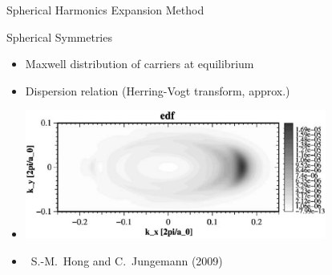 \documentclass[usepdftitle=false,handout,10pt]{beamer}
\begin{document}
\begin{frame}{Spherical Harmonics Expansion Method}

 \vspace*{-0.3cm}
  \begin{block}{Spherical Symmetries}
  \begin{itemize}
   \item Maxwell distribution of carriers at equilibrium
   \item Dispersion relation (Herring-Vogt transform, approx.)
  \end{itemize}
  \end{block}

  \vspace*{-0.5cm}
  \begin{block}{}
   \begin{itemize}
    \item \includegraphics[width=0.78\textwidth]{edf}
    \item {\scriptsize \ S.-M.~Hong and C.~Jungemann (2009)}
   \end{itemize}
  \end{block}

\end{frame}
\end{document}
